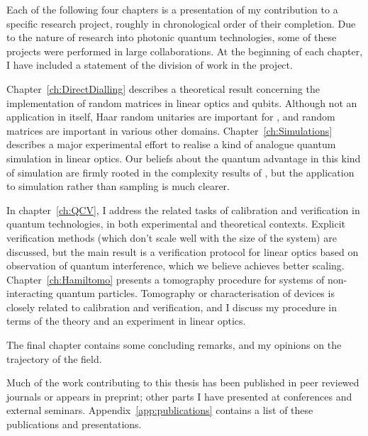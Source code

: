 Each of the following four chapters is a presentation of my contribution to a
specific research project, roughly in chronological order of their completion.
Due to the nature of research into photonic quantum technologies, some of these
projects were performed in large collaborations. At the beginning of each
chapter, I have included a statement of the division of work in the project.

Chapter~\ref{ch:DirectDialling} describes a theoretical result concerning the
implementation of random matrices in linear optics and qubits. Although not an
application in itself, Haar random unitaries are important for \bosonsampling{},
and random matrices are important in various other domains.
Chapter~\ref{ch:Simulations} describes a major experimental effort to realise a
kind of analogue quantum simulation in linear optics. Our beliefs about the
quantum advantage in this kind of simulation are firmly rooted in the
complexity results of \bosonsampling{}, but the application to simulation rather
than sampling is much clearer.

In chapter~\ref{ch:QCV}, I address the related tasks of calibration and
verification in quantum technologies, in both experimental and theoretical
contexts. Explicit verification methods (which don't scale well with the size of
the system) are discussed, but the main result is a verification protocol for
linear optics based on observation of quantum interference, which we believe
achieves better scaling. Chapter~\ref{ch:Hamiltomo} presents a tomography
procedure for systems of non-interacting quantum particles. Tomography or
characterisation of devices is closely related to calibration and verification,
and I discuss my procedure in terms of the theory and an experiment in linear
optics.

The final chapter contains some concluding remarks, and my opinions on the
trajectory of the field.

Much of the work contributing to this thesis has been published in peer reviewed
journals or appears in preprint; other parts I have presented at conferences and
external seminars. Appendix~\ref{app:publications} contains a list of
these publications and presentations.

